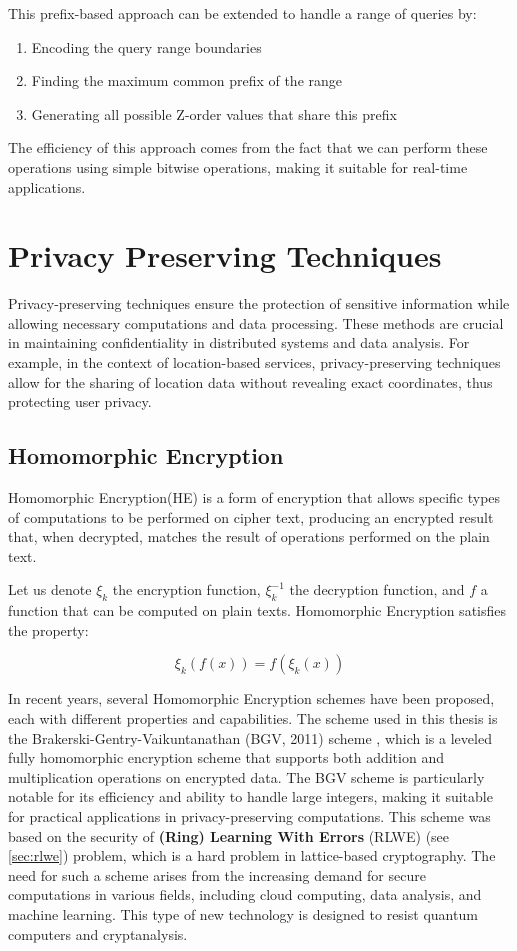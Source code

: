 This prefix-based approach can be extended to handle a range of queries by:
\begin{enumerate}
    \item Encoding the query range boundaries
    \item Finding the maximum common prefix of the range
    \item Generating all possible Z-order values that share this prefix
\end{enumerate}

The efficiency of this approach comes from the fact that we can perform these operations using simple bitwise operations, making it suitable for real-time applications.


\section{Privacy Preserving Techniques}
Privacy-preserving techniques ensure the protection of sensitive information while allowing necessary computations and data processing. These methods are crucial in maintaining confidentiality in distributed systems and data analysis. For example, in the context of location-based services, privacy-preserving techniques allow for the sharing of location data without revealing exact coordinates, thus protecting user privacy.

\subsection{Homomorphic Encryption}
Homomorphic Encryption(HE) is a form of encryption that allows specific types of computations to be performed on cipher text, producing an encrypted result that, when decrypted, matches the result of operations performed on the plain text.

Let us denote \( \xi_k \) the encryption function, \( \xi_k^{-1} \) the decryption function, and \( f \) a function that can be computed on plain texts. Homomorphic Encryption satisfies the property:

\[
    \xi_k(f(x)) = f(\xi_k(x))
\]

In recent years, several Homomorphic Encryption schemes have been proposed, each with different properties and capabilities. The scheme used in this thesis is the Brakerski-Gentry-Vaikuntanathan (BGV, 2011) scheme \cite{Brakerski2012-wj}, which is a leveled fully homomorphic encryption scheme that supports both addition and multiplication operations on encrypted data. The BGV scheme is particularly notable for its efficiency and ability to handle large integers, making it suitable for practical applications in privacy-preserving computations.
This scheme was based on the security of \textbf{(Ring) Learning With Errors} (RLWE) (see \cref{sec:rlwe}) problem, which is a hard problem in lattice-based cryptography. The need for such a scheme arises from the increasing demand for secure computations in various fields, including cloud computing, data analysis, and machine learning. This type of new technology is designed to resist quantum computers and cryptanalysis. 

